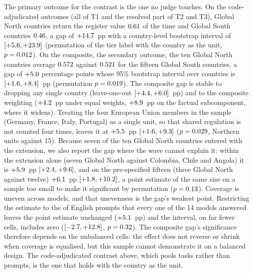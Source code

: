 The primary outcome for the contrast is the one no judge touches. On the
code-adjudicated outcomes (all of T1 and the resolved part of T2 and T3), Global
North countries return the register value $0.61$ of the time and Global
South countries $0.46$, a gap of $+14.7$~pp with a country-level
bootstrap interval of $[+5.6,+23.9]$ (permutation of the tier label with the
country as the unit, $p=0.012$). On the composite, the secondary outcome, the ten Global North
countries average $0.572$ against $0.521$ for the fifteen Global South
countries, a gap of $+5.0$ percentage points whose 95\% bootstrap interval
over countries is $[+1.6,+8.4]$~pp (permutation $p=0.019$). The
composite gap is stable to dropping any single country (leave-one-out
$[+4.4,+6.0]$~pp) and to the composite weighting
($+4.2$~pp under equal weights, $+8.9$~pp on the factual
subcomponent, where it widens). Treating the four European Union members in the
sample (Germany, France, Italy, Portugal) as a single unit, so that shared
regulation is not counted four times, leaves it at $+5.5$~pp
$[+1.6,+9.3]$ ($p=0.029$, \ngapeuunits{} Northern units against 15). Because
seven of the ten Global North countries entered with the extension, we also
report the gap where the wave cannot explain it: within the extension alone
(seven Global North against Colombia, Chile and Angola) it is
$+5.9$~pp $[+2.4,+9.6]$, and on the pre-specified fifteen (three
Global North against twelve) $+6.1$~pp $[+1.8,+10.2]$, a point
estimate of the same size on a sample too small to make it significant by
permutation ($p=0.13$). Coverage is uneven across models, and that
unevenness is the gap's weakest point. Restricting the estimate to the
\ngapbalprompts{} of \ngapbaltotal{} English prompts that every one of the 14
models answered leaves the point estimate unchanged ($+5.1$~pp) and the
interval, on far fewer cells, includes zero ($[-2.7,+12.8]$, $p=0.32$). The
composite gap's significance therefore depends on the unbalanced cells: the
effect does not reverse or shrink when coverage is equalised, but this sample
cannot demonstrate it on a balanced design. The code-adjudicated contrast above,
which pools tasks rather than prompts, is the one that holds with the country as
the unit.

